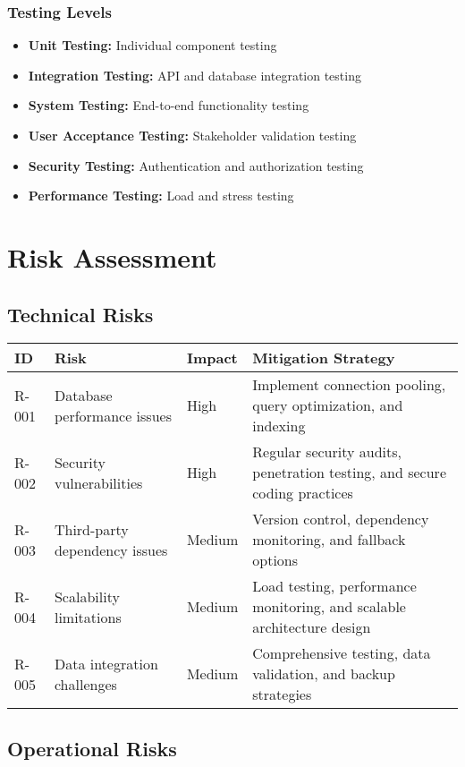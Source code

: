 \documentclass[12pt,a4paper]{article}
\begin{document}
\subsubsection{Testing Levels}
\begin{itemize}
    \item \textbf{Unit Testing:} Individual component testing
    \item \textbf{Integration Testing:} API and database integration testing
    \item \textbf{System Testing:} End-to-end functionality testing
    \item \textbf{User Acceptance Testing:} Stakeholder validation testing
    \item \textbf{Security Testing:} Authentication and authorization testing
    \item \textbf{Performance Testing:} Load and stress testing
\end{itemize}

\section{Risk Assessment}

\subsection{Technical Risks}

\begin{longtable}{|p{1cm}|p{4cm}|p{2cm}|p{7cm}|}
\hline
\textbf{ID} & \textbf{Risk} & \textbf{Impact} & \textbf{Mitigation Strategy} \\
\hline
R-001 & Database performance issues & High & Implement connection pooling, query optimization, and indexing \\
\hline
R-002 & Security vulnerabilities & High & Regular security audits, penetration testing, and secure coding practices \\
\hline
R-003 & Third-party dependency issues & Medium & Version control, dependency monitoring, and fallback options \\
\hline
R-004 & Scalability limitations & Medium & Load testing, performance monitoring, and scalable architecture design \\
\hline
R-005 & Data integration challenges & Medium & Comprehensive testing, data validation, and backup strategies \\
\hline
\end{longtable}

\subsection{Operational Risks}
\end{document}
